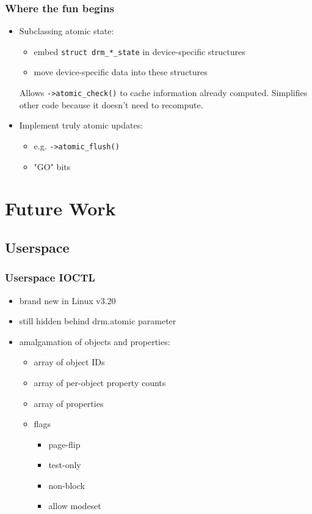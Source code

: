 \documentclass[t]{beamer}
\begin{document}
\begin{frame}
	\frametitle{Where the fun begins}
	\begin{itemize}
		\item Subclassing atomic state:
			\begin{itemize}
				\item embed {\tt struct drm\_*\_state} in device-specific
					structures
				\item move device-specific data into these structures
			\end{itemize}
			Allows {\tt ->atomic\_check()} to cache information already
			computed. Simplifies other code because it doesn't need to
			recompute.
		\item Implement truly atomic updates:
			\begin{itemize}
				\item e.g. {\tt ->atomic\_flush()}
				\item "GO" bits
			\end{itemize}
	\end{itemize}
\end{frame}

\section{Future Work}

\subsection{Userspace}

\begin{frame}
	\frametitle{Userspace IOCTL}
	\begin{itemize}
		\item brand new in Linux v3.20
		\item still hidden behind drm.atomic parameter
		\item amalgamation of objects and properties:
			\begin{itemize}
				\item array of object IDs
				\item array of per-object property counts
				\item array of properties
				\item flags
					\begin{itemize}
						\item page-flip
						\item test-only
						\item non-block
						\item allow modeset
					\end{itemize}
			\end{itemize}
	\end{itemize}
\end{frame}
\end{document}
